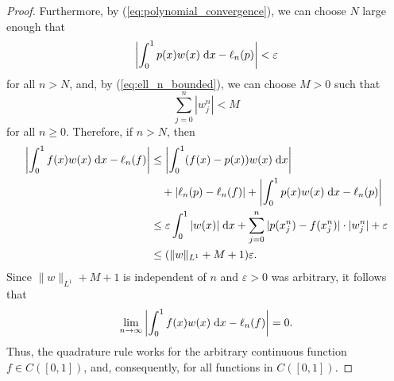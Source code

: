 \documentclass{homework}
\begin{document}
\begin{arabicparts}
\begin{proof}
			Furthermore, by (\ref{eq:polynomial_convergence}), we can choose $N$ large enough that
			\begin{equation}
				\left|\int_0^1 p(x)w(x)\;\text{d} x - \ell_n(p)\right| < \varepsilon
			\end{equation}
			for all $n > N$, and, by (\ref{eq:ell_n_bounded}), we can choose $M > 0$ such that
			\begin{equation}
				\sum_{j=0}^n |w_j^n| < M
			\end{equation}
			for all $n \ge0$. Therefore, if $n > N$, then
			\begin{align}
				\left|\int_0^1 f(x)w(x)\;\text{d} x - \ell_n(f)\right| &\le \left|\int_0^1(f(x) - p(x))w(x)\;\text{d} x\right| \\
				&\quad+ \left|\ell_n(p) - \ell_n(f)\right| + \left|\int_0^1p(x)w(x)\;\text{d} x - \ell_n(p)\right| \\
				&\le \varepsilon\int_0^1|w(x)|\;\text{d} x + \sum_{j=0}^n |p(x_j^n) - f(x_j^n)|\cdot|w_j^n| + \varepsilon \\
				&\le (\lVert w \rVert_{L^1} + M + 1)\varepsilon.
			\end{align}
			Since $\lVert w \rVert_{L^1} + M + 1$ is independent of $n$ and $\varepsilon > 0$ was arbitrary, it follows that
			\begin{equation}
				\lim_{n\to\infty}\left|\int_0^1 f(x)w(x)\;\text{d} x - \ell_n(f)\right| = 0.
			\end{equation}
			Thus, the quadrature rule works for the arbitrary continuous function $f \in C([0,1])$, and, consequently, for all functions in $C([0,1])$.
		\end{proof}
	\end{arabicparts}
	
\end{document}
